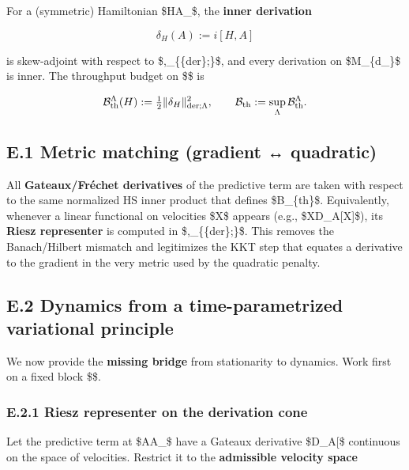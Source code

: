 \documentclass[
]{article}
\numberwithin{equation}{section}
\begin{document}
For a (symmetric) Hamiltonian \$H\in\mathcal A\_\Lambda\$, the
\textbf{inner derivation}

\[
\delta_H(A):=i[H,A]
\]

is skew-adjoint with respect to
\$\langle\cdot,\cdot\rangle\_\{\{\rm der\};\Lambda\}\$, and every
derivation on \$M\_\{d\_\Lambda\}\$ is inner. The throughput budget on
\$\Lambda\$ is

\[
\mathcal B_{\rm th}^\Lambda(H):=\tfrac12\|\delta_H\|_{{\rm der};\Lambda}^{2},\qquad 
\mathcal B_{\rm th}:=\sup_\Lambda \mathcal B_{\rm th}^\Lambda.
\]

\hypertarget{e.1-metric-matching-gradient-quadratic}{%
\subsection{E.1 Metric matching (gradient ↔
quadratic)}\label{e.1-metric-matching-gradient-quadratic}}

All \textbf{Gateaux/Fréchet derivatives} of the predictive term are
taken with respect to the same normalized HS inner product that defines
\$\mathcal B\_\{\rm th\}\$. Equivalently, whenever a linear functional
on velocities \$X\$ appears (e.g., \$X\mapsto D\Phi\_A{[}X{]}\$), its
\textbf{Riesz representer} is computed in
\$\langle\cdot,\cdot\rangle\_\{\{\rm der\};\Lambda\}\$. This removes the
Banach/Hilbert mismatch and legitimizes the KKT step that equates a
derivative to the gradient in the very metric used by the quadratic
penalty.

\hypertarget{e.2-dynamics-from-a-time-parametrized-variational-principle}{%
\subsection{E.2 Dynamics from a time-parametrized variational
principle}\label{e.2-dynamics-from-a-time-parametrized-variational-principle}}

We now provide the \textbf{missing bridge} from stationarity to
dynamics. Work first on a fixed block \$\Lambda\$.

\hypertarget{e.2.1-riesz-representer-on-the-derivation-cone}{%
\subsubsection{E.2.1 Riesz representer on the derivation
cone}\label{e.2.1-riesz-representer-on-the-derivation-cone}}

Let the predictive term at \$A\in\mathcal A\_\Lambda\$ have a Gateaux
derivative \$D\Phi\_A{[}\cdot{]}\$ continuous on the space of
velocities. Restrict it to the \textbf{admissible velocity space}
\end{document}
